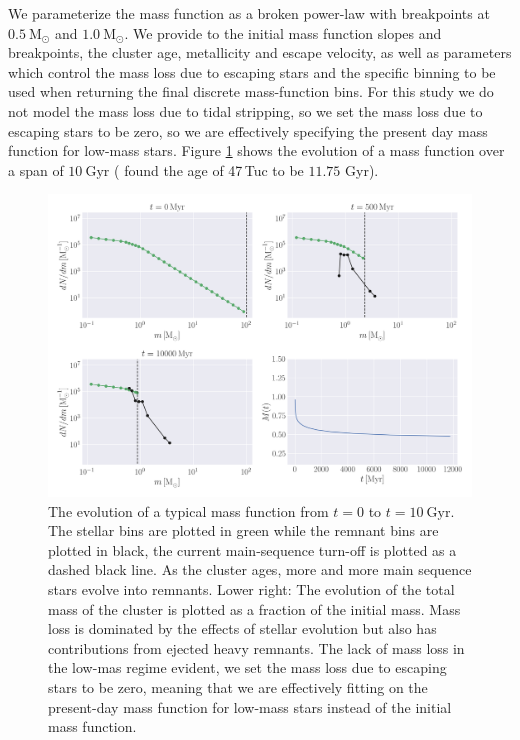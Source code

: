 We parameterize the mass function as a broken power-law with breakpoints at $0.5 \ \mathrm{M}_\odot$
and $1.0 \ \mathrm{M}_\odot$. We provide to \evolvemf{} the initial mass function slopes and
breakpoints, the cluster age, metallicity and escape velocity, as well as parameters which control
the mass loss due to escaping stars and the specific binning to be used when returning the final
discrete mass-function bins. For this study we do not model the mass loss due to tidal stripping, so
we set the mass loss due to escaping stars to be zero, so we are effectively specifying the present
day mass function for low-mass stars. Figure \ref{fig:2/evolve_mf} shows the evolution of a mass
function over a span of $10 \ \mathrm{Gyr}$ (\citealt{Baumgardt2017a} found the age of 47\,Tuc to be
$11.75$ Gyr).

\begin{figure}
    \centering
    \includegraphics[width=\textwidth]{figures/evolve_mf.png}
    \caption{The evolution of a typical mass function from $t=0$ to $t=10 \ \mathrm{Gyr}$. The
        stellar bins are plotted in green while the remnant bins are plotted in black, the current
        main-sequence turn-off is plotted as a dashed black line. As the cluster ages, more and more
        main sequence stars evolve into remnants. Lower right: The evolution of the total mass of
        the cluster is plotted as a fraction of the initial mass. Mass loss is dominated by the
        effects of stellar evolution but also has contributions from ejected heavy remnants. The
        lack of mass loss in the low-mas regime evident, we set the mass loss due to escaping stars
to be zero, meaning that we are effectively fitting on the present-day mass function for
low-mass stars instead of the initial mass function.}
    \label{fig:2/evolve_mf}
\end{figure}



